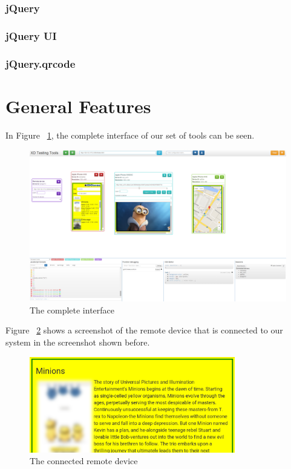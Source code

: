 \subsubsection{jQuery}

\subsubsection{jQuery UI}

\subsubsection{jQuery.qrcode}

\section{General Features}

In Figure ~\ref{fig:complete}, the complete interface of our set of tools can be seen.

\begin{figure}[H]
  \centering
    \includegraphics[width=1.0\textwidth]{images/screenshots/complete.png}
	\caption{The complete interface}
	\label{fig:complete}
\end{figure}

Figure ~\ref{fig:complete_remote} shows a screenshot of the remote device that is connected to our system in the screenshot shown before.

\begin{figure}[H]
  \centering
    \includegraphics[width=0.8\textwidth]{images/screenshots/complete_remote_2.png}
	\caption{The connected remote device}
	\label{fig:complete_remote}
\end{figure}

